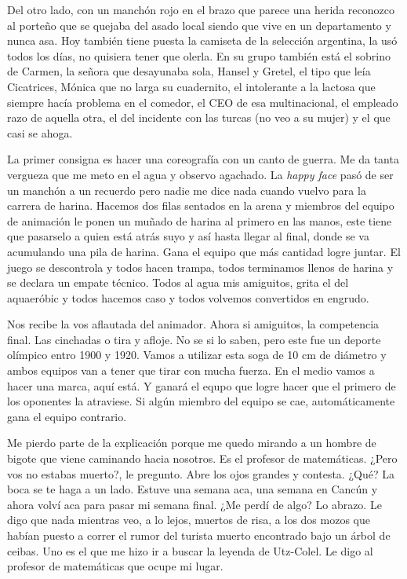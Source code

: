 \documentclass[12pt,twoside,openright,a5paper]{book}
\begin{document}
Del otro lado, con un manchón rojo en el brazo que parece una herida
reconozco al porteño que se quejaba del asado local siendo que vive en
un departamento y nunca asa. Hoy también tiene puesta la camiseta de
la selección argentina, la usó todos los días, no quisiera tener que
olerla. En su grupo también está el sobrino de Carmen, la señora que
desayunaba sola, Hansel y Gretel, el tipo que leía Cicatrices, Mónica que no
larga su cuadernito, el intolerante a la lactosa que siempre hacía problema
en el comedor, el CEO de esa multinacional, el empleado razo de aquella otra,
el del incidente con las turcas (no veo a su mujer) y el que casi se ahoga.

La primer consigna es hacer una coreografía con un canto de guerra. Me da
tanta vergueza que me meto en el agua y observo agachado. La \emph{happy face} pasó
de ser un manchón a un recuerdo pero nadie me dice nada cuando vuelvo para
la carrera de harina. Hacemos dos filas sentados en la arena y miembros del
equipo de animación le ponen un muñado de harina al primero en las manos,
este tiene que pasarselo a quien está atrás suyo y así hasta llegar
al final, donde se va acumulando una pila de harina. Gana el equipo que
más cantidad logre juntar. El juego se descontrola y todos hacen trampa,
todos terminamos llenos de harina y se declara un empate técnico. Todos
al agua mis amiguitos, grita el del aquaeróbic y todos hacemos caso y todos
volvemos convertidos en engrudo.

Nos recibe la vos aflautada del animador.
Ahora si amiguitos, la competencia final. Las cinchadas o tira y afloje. No
se si lo saben, pero este fue un deporte olímpico entro 1900 y 1920. Vamos a
utilizar esta soga de 10 cm de diámetro y ambos equipos van a tener que tirar
con mucha fuerza. En el medio vamos a hacer una marca, aquí está. Y ganará
el equpo que logre hacer que el primero de los oponentes la atraviese. Si
algún miembro del equipo se cae, automáticamente gana el equipo contrario.

Me pierdo parte de la explicación porque me quedo mirando a un
hombre de bigote que viene caminando hacia nosotros. Es el profesor de
matemáticas. ¿Pero vos no estabas muerto?, le pregunto. Abre los ojos
grandes y contesta. ¿Qué? La boca se te haga a un lado. Estuve una semana
aca, una semana en Cancún y ahora volví aca para pasar mi semana final. ¿Me
perdí de algo? Lo abrazo. Le digo que nada mientras veo, a lo lejos, muertos de risa,
a los dos mozos que habían puesto a correr el rumor del turista muerto
encontrado bajo un árbol de ceibas. Uno es el que me hizo ir a buscar la
leyenda de Utz-Colel. Le digo al profesor de matemáticas que ocupe mi lugar.
\end{document}
